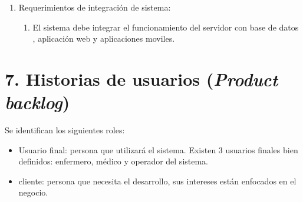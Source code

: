 \documentclass[
11pt, %
]{charter}
\begin{document}
\begin{enumerate}
\begin{enumerate}
		\end{enumerate}
		
		
	\item Requerimientos de integración de sistema:	
			\begin{enumerate}
			\item El sistema debe integrar el funcionamiento del servidor con base de datos , aplicación web y aplicaciones moviles.
			
			\end{enumerate}	
	

\end{enumerate}


\section{7. Historias de usuarios (\textit{Product backlog})}
\label{sec:backlog}



Se identifican los siguientes roles:
\begin{itemize}
	\item Usuario final: persona que utilizará el sistema. Existen 3 usuarios finales bien definidos: enfermero, médico y operador del sistema.
	\item cliente: persona que necesita el desarrollo, sus intereses están enfocados en el negocio.

\end{itemize}
\end{document}
